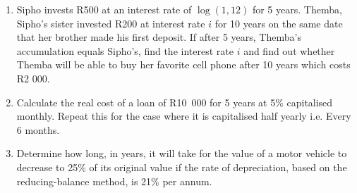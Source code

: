\begin{enumerate}
\item{Sipho invests R500 at an interest rate of $\log(1,12)$ for 5 years. Themba, Sipho's sister invested R200 at interest rate $i$ for 10 years on the same date that her brother made his first deposit. If after 5 years, Themba's accumulation equals Sipho's, find the interest rate $i$ and find out whether Themba will be able to buy her favorite cell phone after 10 years which costs R2 000.}


\item{Calculate the real cost of a loan of R10~000 for 5 years at 5\% capitalised monthly. Repeat this for the case where it is capitalised half yearly i.e. Every 6 months.}
\item{Determine how long, in years, it will take for the value of a motor vehicle to decrease
to 25\% of its original value if the rate of depreciation, based on the reducing-balance
method, is 21\% per annum.}


\end{enumerate}







